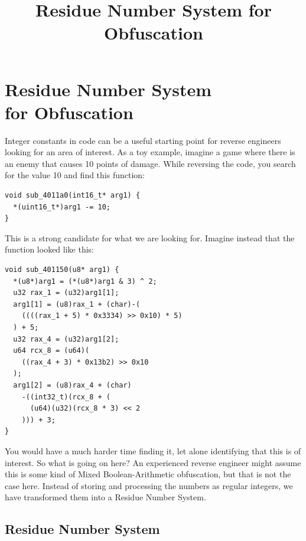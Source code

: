 \documentclass[twocolumn]{article}
\begin{document}
\title{Residue Number System for Obfuscation}
\date{}

\section*{Residue Number System \\ for Obfuscation}
\vspace*{-0.5\baselineskip}

Integer constants in code can be a useful starting point for reverse engineers looking for an area of interest. As a toy example, imagine a game where there is an enemy that causes 10 points of damage. While reversing the code, you search for the value 10 and find this function:

\begin{verbatim}
void sub_4011a0(int16_t* arg1) {
  *(uint16_t*)arg1 -= 10;
}
\end{verbatim}

This is a strong candidate for what we are looking for. Imagine instead that the function looked like this:

\begin{verbatim}
void sub_401150(u8* arg1) {
  *(u8*)arg1 = (*(u8*)arg1 & 3) ^ 2;
  u32 rax_1 = (u32)arg1[1];
  arg1[1] = (u8)rax_1 + (char)-(
    ((((rax_1 + 5) * 0x3334) >> 0x10) * 5)
  ) + 5;
  u32 rax_4 = (u32)arg1[2];
  u64 rcx_8 = (u64)(
    ((rax_4 + 3) * 0x13b2) >> 0x10
  );
  arg1[2] = (u8)rax_4 + (char)
    -((int32_t)(rcx_8 + (
      (u64)(u32)(rcx_8 * 3) << 2
    ))) + 3;
}
\end{verbatim}

You would have a much harder time finding it, let alone identifying that this is of interest. So what is going on here? An experienced reverse engineer might assume this is some kind of Mixed Boolean-Arithmetic obfuscation, but that is not the case here. Instead of storing and processing the numbers as regular integers, we have transformed them into a Residue Number System.

\vspace*{-0.5\baselineskip}
\subsection*{Residue Number System}
\end{document}
